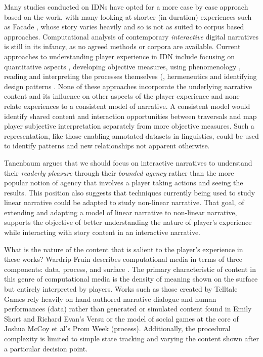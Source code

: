 Many studies conducted on IDNs have opted for a more case by case
approach based on the work, with many looking at shorter (in duration)
experiences such as Facade \cite{Seif_El-Nasr2013-hp}, whose story
varies heavily and so is not as suited to corpus based
approaches. Computational analysis of contemporary \emph{interactive}
digital narratives is still in its infancy, as no agreed methods or
corpora are available. Current approaches to understanding player
experience in IDN include focusing on quantitative aspects
\cite{Marczak2013-np}, developing objective
measures\cite{Szilas2014-fd}, using phenomenology
\cite{Seif_El-Nasr2013-hp}, reading and interpreting the processes
themselves (\cite{Wardrip-fruin2006-je}, hermeneutics
\cite{Arjoranta2015-rw} and identifying design patterns
\cite{Reed2014-qw}. None of these approaches incorporate the
underlying narrative content and its influence on other aspects of the
player experience and none relate experiences to a consistent model of
narrative. A consistent model would identify shared content and
interaction opportunities between traversals and map player subjective
interpretation separately from more objective measures. Such a
representation, like those enabling annotated datasets in linguistics,
could be used to identify patterns and new relationships not apparent
otherwise.

Tanenbaum argues that we should focus on interactive narratives to
understand their \emph{readerly pleasure} through their \emph{bounded agency}
\cite{Tanenbaum2011-yu} rather than the more popular notion of agency
that involves a player taking actions and seeing the results. This
position also suggests that techniques currently being used to study
linear narrative could be adapted to study non-linear narrative. That
goal, of extending and adapting a model of linear narrative to
non-linear narrative, supports the objective of better understanding
the nature of player's experience while interacting with story content
in an interactive narrative.

What is the nature of the content that is salient to the player's
experience in these works? Wardrip-Fruin describes computational media
in terms of three components: data, process, and surface
\cite{Wardrip-Fruin2009-pe}. The primary characteristic of content in
this genre of computational media is the density of meaning shown on
the surface but entirely interpreted by players. Works such as those
created by Telltale Games rely heavily on hand-authored narrative
dialogue and human performances (data) rather than generated or
simulated content found in Emily Short and Richard Evan's Versu
\cite{Evans2014-nk} or the model of social games at the core of Joshua
McCoy et al's Prom Week (process). Additionally, the procedural
complexity is limited to simple state tracking and varying the content
shown after a particular decision point.

